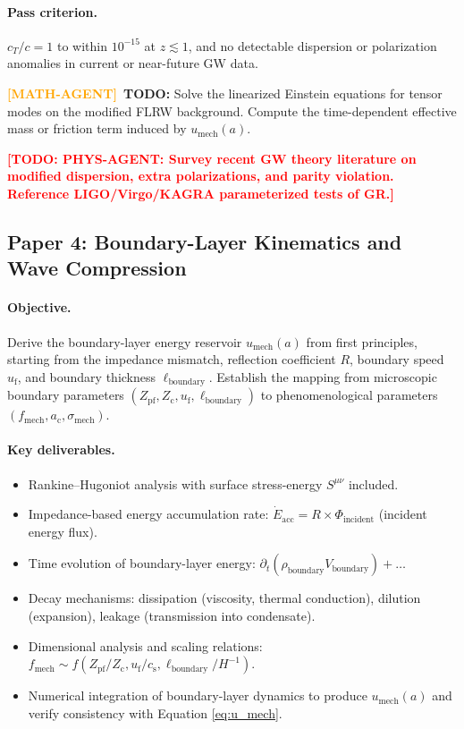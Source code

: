 \documentclass[11pt,a4paper]{article}
\newcommand{\ac}{a_{\mathrm{c}}}
\newcommand{\cs}{c_{\mathrm{s}}}
\newcommand{\sigmamech}{\sigma_{\mathrm{mech}}}
\newcommand{\fmech}{f_{\mathrm{mech}}}
\newcommand{\umech}{u_{\mathrm{mech}}}
\newcommand{\Zpf}{Z_{\mathrm{pf}}}
\newcommand{\Zcond}{Z_{\mathrm{c}}}
\newcommand{\uf}{u_{\mathrm{f}}}
\theoremstyle{definition}
\newcommand{\TODO}[1]{\textcolor{red}{\textbf{[TODO: #1]}}}
\newcommand{\MATHAGENT}{\textcolor{orange}{\textbf{[MATH-AGENT]}}}
\begin{document}
\paragraph{Pass criterion.}
$c_T/c = 1$ to within $10^{-15}$ at $z \lesssim 1$, and no detectable dispersion or polarization anomalies in current or near-future GW data.

\MATHAGENT~\textbf{TODO:} Solve the linearized Einstein equations for tensor modes on the modified FLRW background. Compute the time-dependent effective mass or friction term induced by $\umech(a)$.

\TODO{PHYS-AGENT: Survey recent GW theory literature on modified dispersion, extra polarizations, and parity violation. Reference LIGO/Virgo/KAGRA parameterized tests of GR.}

\subsection{Paper 4: Boundary-Layer Kinematics and Wave Compression}
\label{sec:paper4}

\paragraph{Objective.}
Derive the boundary-layer energy reservoir $\umech(a)$ from first principles, starting from the impedance mismatch, reflection coefficient $R$, boundary speed $\uf$, and boundary thickness $\ell_{\mathrm{boundary}}$. Establish the mapping from microscopic boundary parameters $(\Zpf, \Zcond, \uf, \ell_{\mathrm{boundary}})$ to phenomenological parameters $(\fmech, \ac, \sigmamech)$.

\paragraph{Key deliverables.}
\begin{itemize}[leftmargin=1.8em]
  \item Rankine--Hugoniot analysis with surface stress-energy $S^{\mu\nu}$ included.
  \item Impedance-based energy accumulation rate: $\dot{E}_{\mathrm{acc}} = R \times \Phi_{\mathrm{incident}}$ (incident energy flux).
  \item Time evolution of boundary-layer energy: $\partial_t (\rho_{\mathrm{boundary}} V_{\mathrm{boundary}}) + \dots$
  \item Decay mechanisms: dissipation (viscosity, thermal conduction), dilution (expansion), leakage (transmission into condensate).
  \item Dimensional analysis and scaling relations: $\fmech \sim f(\Zpf/\Zcond, \uf/\cs, \ell_{\mathrm{boundary}}/H^{-1})$.
  \item Numerical integration of boundary-layer dynamics to produce $\umech(a)$ and verify consistency with Equation \eqref{eq:u_mech}.
\end{itemize}
\end{document}
